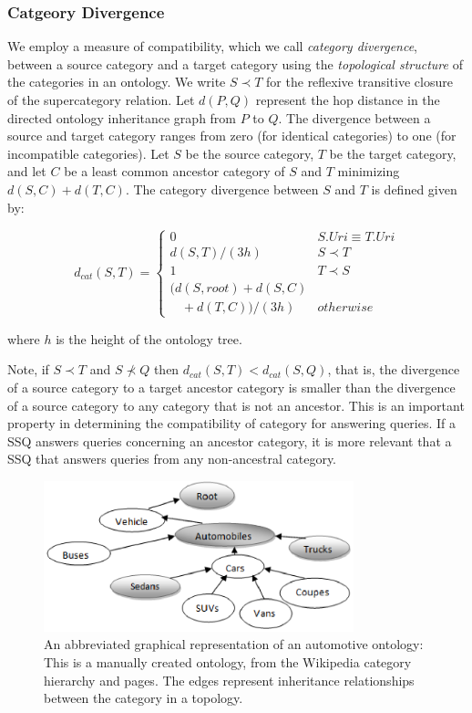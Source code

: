 \subsubsection{Catgeory Divergence}
\label{sec:ctd}

We employ a measure of compatibility, which we call \textit{category
divergence},
between a source category and a target category using the \textit{topological
structure} of the categories in an ontology. We write $S \prec T$ for the
reflexive
transitive closure of the supercategory relation. Let $d(P,Q)$ represent the hop
distance in the directed ontology inheritance graph from $P$ to $Q$. The
divergence between a source and target category ranges from zero (for identical
categories) to one (for incompatible categories). Let $S$ be the source
category, $T$ be
the target category, and let $C$ be a least common ancestor category of $S$ and
$T$
minimizing $d(S,C) + d(T,C)$. The category divergence between $S$ and $T$ is
defined given by:

\begin{equation}
d_{cat}(S, T) = \begin{cases}
0 & S.{Uri} \equiv T.{Uri}\\
d(S, T)/(3h) & S \prec T\\
1 & T \prec S\\
(d(S,root) + d(S,C) \\ \ \ \ \ + d(T,C))/(3h) & otherwise
\end{cases}
\end{equation}

\noindent where $h$ is the height of the ontology tree.

Note, if $S \prec T$ and $S \not\prec Q$ then $d_{cat}(S,T) <
d_{cat}(S,Q)$, that is, the divergence of a source category to a target
ancestor category is smaller than the divergence of a source category to any
category that is not an ancestor. This is an important property in
determining the compatibility of category for answering queries.  If a
SSQ answers queries concerning an ancestor category, it is more relevant
that a SSQ that answers queries from any non-ancestral category.

\begin{figure}[t]
\centering
\includegraphics[width=90mm]{img/automotive_ontology.eps}
\caption{An abbreviated graphical representation of an automotive
ontology: This is a manually created ontology, from the Wikipedia category
hierarchy and pages. The edges represent inheritance relationships between the
category in a topology.}
\label{fig:automotive_ontology}
\end{figure}

